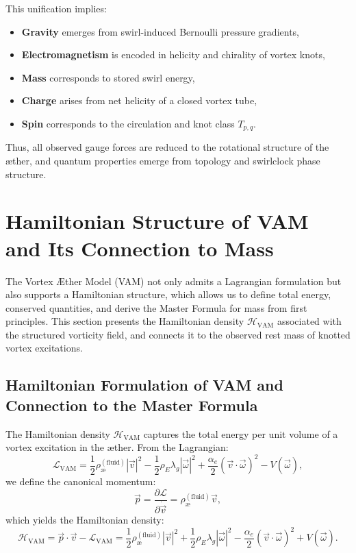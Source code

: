 \documentclass[preprint]{revtex4-2}
\begin{document}
This unification implies:
\begin{itemize}
    \item \textbf{Gravity} emerges from swirl-induced Bernoulli pressure gradients,
    \item \textbf{Electromagnetism} is encoded in helicity and chirality of vortex knots,
    \item \textbf{Mass} corresponds to stored swirl energy,
    \item \textbf{Charge} arises from net helicity of a closed vortex tube,
    \item \textbf{Spin} corresponds to the circulation and knot class \( T_{p,q} \).
\end{itemize}

Thus, all observed gauge forces are reduced to the rotational structure of the æther, and quantum properties emerge from topology and swirlclock phase structure.
\section{Hamiltonian Structure of VAM and Its Connection to Mass}

The Vortex \AE ther Model (VAM) not only admits a Lagrangian formulation but also supports a Hamiltonian structure, which allows us to define total energy, conserved quantities, and derive the Master Formula for mass from first principles. This section presents the Hamiltonian density \( \mathcal{H}_\text{VAM} \) associated with the structured vorticity field, and connects it to the observed rest mass of knotted vortex excitations.

\subsection{Hamiltonian Formulation of VAM and Connection to the Master Formula}

The Hamiltonian density \( \mathcal{H}_\text{VAM} \) captures the total energy per unit volume of a vortex excitation in the æther. From the Lagrangian:
\begin{equation}
\mathcal{L}_\text{VAM} =
\frac{1}{2} \rho_\text{\ae}^{(\text{fluid})} |\vec{v}|^2
- \frac{1}{2} \rho_{\scriptscriptstyle\boldsymbol\!E}\lambda_g |\vec{\omega}|^2
+ \frac{\alpha_e}{2} (\vec{v} \cdot \vec{\omega})^2
- V(\vec{\omega}),
\end{equation}
we define the canonical momentum:
\begin{equation}
\vec{p} = \frac{\partial \mathcal{L}}{\partial \dot{\vec{v}}} = \rho_\text{\ae}^{(\text{fluid})} \vec{v},
\end{equation}
which yields the Hamiltonian density:
\begin{equation}
\mathcal{H}_\text{VAM} = \vec{p} \cdot \vec{v} - \mathcal{L}_\text{VAM}
= \frac{1}{2} \rho_\text{\ae}^{(\text{fluid})} |\vec{v}|^2
+ \frac{1}{2} \rho_{\scriptscriptstyle\boldsymbol\!E}\lambda_g |\vec{\omega}|^2
- \frac{\alpha_e}{2} (\vec{v} \cdot \vec{\omega})^2
+ V(\vec{\omega}).
\end{equation}
\end{document}
